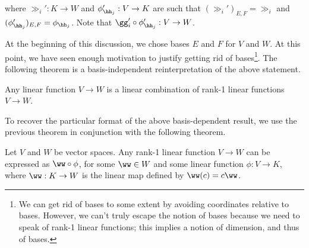 where $\gg_i':K \rightarrow W$ and $\phi_{\hh_j}':V \rightarrow K$ are such that $(\gg_i')_{E,F} = \gg_i$ and $(\phi_{\hh_j}')_{E,F} = \phi_{\hh_j}$. Note that $\gg_i' \circ \phi_{\hh_j}':V \rightarrow W$.

At the beginning of this discussion, we chose bases $E$ and $F$ for $V$ and $W$. At this point, we have seen enough motivation to justify getting rid of bases\footnote{We can get rid of bases to some extent by avoiding coordinates relative to bases. However, we can't truly escape the notion of bases because we need to speak of rank-1 linear functions; this implies a notion of dimension, and thus of bases.}. The following theorem is a basis-independent reinterpretation of the above statement.

\begin{theorem}
    Any linear function $V \rightarrow W$ is a linear combination of rank-1 linear functions $V \rightarrow W$.
\end{theorem}

To recover the particular format of the above basis-dependent result, we use the previous theorem in conjunction with the following theorem.

\begin{theorem}
    Let $V$ and $W$ be vector spaces. Any rank-1 linear function $V \rightarrow W$ can be expressed as $\ww \circ \phi$, for some $\ww \in W$ and some linear function $\phi:V \rightarrow K$, where $\ww:K \rightarrow W$ is the linear map defined by $\ww(c) = c \ww$.
\end{theorem}


